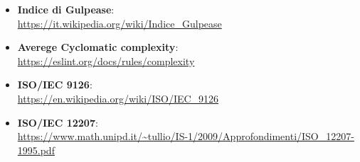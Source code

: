 \begin{itemize}
	\item \textbf{Indice di Gulpease}:\\
	\textcolor{blue}{\url{https://it.wikipedia.org/wiki/Indice_Gulpease}}
	
	\item \textbf{Averege Cyclomatic complexity}:\\
	\textcolor{blue}{\url{https://eslint.org/docs/rules/complexity}}
	
	\item \textbf{ISO/IEC 9126}:\\
	\textcolor{blue}{\url{https://en.wikipedia.org/wiki/ISO/IEC_9126}}
	
	\item \textbf{ISO/IEC 12207}:\\
	\textcolor{blue}{\url{https://www.math.unipd.it/~tullio/IS-1/2009/Approfondimenti/ISO_12207-1995.pdf}}
	
\end{itemize}